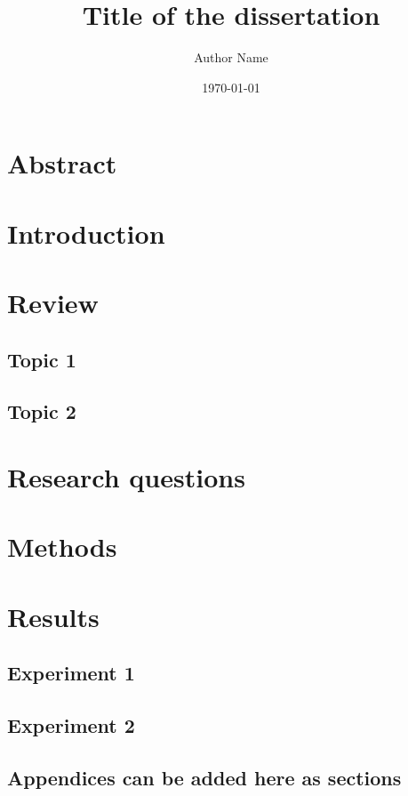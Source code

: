 \documentclass{uhthesis}
\title{Title of the dissertation}
\author{Author Name}
\date{\today}
\begin{document}
\maketitle
\tableofcontents
\newpage

\section{Abstract}
\section{Introduction}
\section{Review}
    \subsection{Topic 1}
    \subsection{Topic 2}
\section{Research questions}
\section{Methods}
\section{Results}
    \subsection{Experiment 1}
    \subsection{Experiment 2}

\begin{appendices}
    \section{Appendices can be added here as sections}
\end{appendices}
\end{document}
